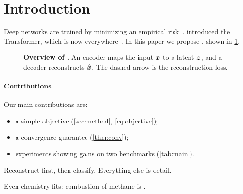 \section{Introduction}\label{sec:intro}
Deep networks are trained by minimizing an empirical risk~\citep{goodfellow2016deep}.
\citet{vaswani2017attention} introduced the Transformer, which is now everywhere~\citep{lecun2015deep, vaswani2017attention}.
In this paper we propose \method, shown in \cref{fig:arch}.

\begin{figure}[t]
  \centering
  
  \caption{\textbf{Overview of \method.} An encoder maps the input $\bm{x}$ to a latent $\bm{z}$,
    and a decoder reconstructs $\hat{\bm{x}}$. The dashed arrow is the reconstruction loss.}
  \label{fig:arch}
\end{figure}

\paragraph{Contributions.} Our main contributions are:
\begin{itemize}[leftmargin=*, nosep]
  \item a simple objective (\cref{sec:method}, \cref{eq:objective});
  \item a convergence guarantee (\cref{thm:conv});
  \item experiments showing gains on two benchmarks (\cref{tab:main}).
\end{itemize}

\begin{tcolorbox}[colback=blue!4, colframe=blue!50!black, title=Key idea]
  Reconstruct first, then classify. Everything else is detail.
\end{tcolorbox}

Even chemistry fits: combustion of methane is .
